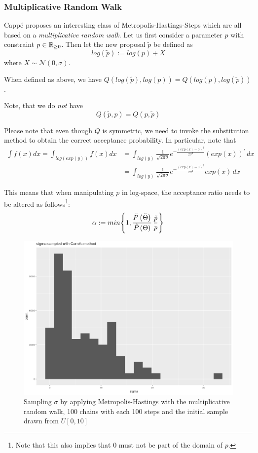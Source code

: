 \subsubsection{Multiplicative Random Walk}
Cappé \cite{cappe} proposes an interesting class of Metropolis-Hastings-Steps which are all based on a \textit{multiplicative random walk}. Let us first consider a parameter $p$ with constraint $p \in \mathbb{R}_{\geq 0}$. Then let the new proposal $\tilde{p}$ be defined as 
\[
	log\left(\tilde{p}\right) := log(p) + X
\]
where $X \sim \mathcal{N}(0, \sigma)$.

\begin{lemma}
	When defined as above, we have $Q\left(log(\tilde{p}), log(p)\right) = Q\left( log(p), log(\tilde{p})\right)$.
	
	Note, that we do \textit{not} have
	\[
	Q\left(\tilde{p}, p\right) = Q\left( p , \tilde{p}\right)
	\]
\end{lemma}

	 Please note that even though $Q$ is symmetric, we need to invoke the substitution method to obtain the correct acceptance probability. 
	 In particular, note that 
	 \begin{align*}
	 	\int f(x) dx = \int_{log(exp(y))} f(x) dx &= 
	 	\int_{log(y)} \frac{1}{\sqrt{2 \pi \sigma}} e^{- \frac{ \left(exp(x) - 0\right)^2}{2 \sigma^2}} \left(exp(x)\right)^{\prime}  \, dx\\
	 	&= \int_{log(y)} \frac{1}{\sqrt{2 \pi \sigma}} e^{- \frac{ \left(exp(x) - 0\right)^2}{2 \sigma^2}} exp(x) \, dx
	 \end{align*} 
	 
	 This means that when manipulating $p$ in log-space, the acceptance ratio needs to be altered as follows\footnote{Note that this also implies that $0$ must not be part of the domain of $p$. }:
	 \[
	 	\alpha := min \Bigg\{ 
	 		1, \frac{\tilde{P}\left(\tilde{\Theta}\right)}{\tilde{P}\left(\Theta\right)} \, \frac{\tilde{p}}{p}
	 		\Bigg\}
	 \]
	 
	 \begin{figure}
	 	\includegraphics[height=0.3\textheight]{img/carre_sigma_biased.png}
	 	\caption{Sampling $\sigma$ by applying Metropolis-Hastings with the multiplicative random walk, 100 chains with each 100 steps and the initial sample drawn from $U[0, 10]$}
	 	\label{fig:carre_sigma_not_uniform}
	 \end{figure}
	 
